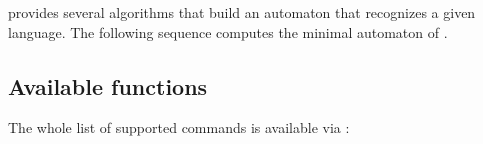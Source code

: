 \Vauc provides several algorithms that build an automaton that
recognizes a given language.  The following sequence computes the
minimal automaton of .

\begin{center}
\end{center}

\subsection{Available functions}

The whole list of supported commands is available via
:



